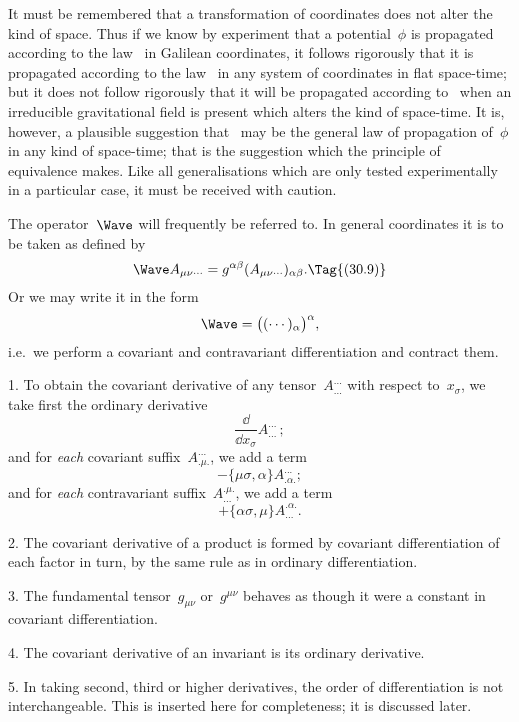\documentclass[12pt]{book}
\begin{document}
It must be remembered that a transformation of coordinates does not alter
the kind of space. Thus if we know by experiment that a potential~$\phi$ is
propagated according to the law~ in Galilean coordinates, it follows
rigorously that it is propagated according to the law~ in any system of
coordinates in flat space-time; but it does not follow rigorously that it will
be propagated according to~ when an irreducible gravitational field is
present which alters the kind of space-time. It is, however, a plausible
suggestion that ~may be the general law of propagation of~$\phi$ in any kind
of space-time; that is the suggestion which the principle of equivalence makes.
Like all generalisations which are only tested experimentally in a particular
case, it must be received with caution.

The operator~$\Wave$ will frequently be referred to. In general coordinates it
%
%
is to be taken as defined by
\[
\Wave A_{\mu\nu\cdots} = g^{\alpha\beta} (A_{\mu\nu\cdots})_{\alpha\beta}.
\Tag{(30.9)}
\]
Or we may write it in the form
\[
\Wave = \bigl((\cdots)_{\alpha}\bigr)^{\alpha},
\]
i.e.\ we perform a covariant and contravariant differentiation and contract
them.

%
%
%

1. To obtain the covariant derivative of any tensor~$A_{...}^{...}$ with respect to~$x_{\sigma}$,
%
we take first the ordinary derivative
\[
\frac{\dd}{\dd x_{\sigma}} A_{...}^{...}\,;
\]
and for \emph{each} covariant suffix~$A_{.\mu.}^{...}$, we add a term
\[
- \{\mu\sigma, \alpha\} A_{.\alpha.}^{...};
\]
and for \emph{each} contravariant suffix~$A_{...}^{.\mu.}$, we add a term
\[
+ \{\alpha\sigma, \mu\} A_{...}^{.\alpha.}.
\]

2. The covariant derivative of a product is formed by covariant differentiation
of each factor in turn, by the same rule as in ordinary differentiation.

3. The fundamental tensor~$g_{\mu\nu}$ or~$g^{\mu\nu}$ behaves as though it were a constant
in covariant differentiation.

4. The covariant derivative of an invariant is its ordinary derivative.

5. In taking second, third or higher derivatives, the order of differentiation
is not interchangeable\footnotemark.\footnotetext
  {This is inserted here for completeness; it is discussed later.}
\end{document}
